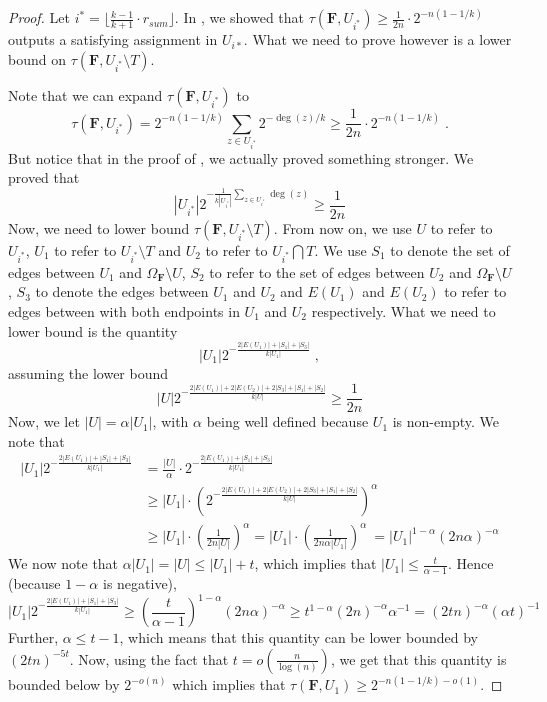 \documentclass[11pt, letterpaper]{article}
\theoremstyle{definition}
\newcommand{\f}{\mathbf{F}}
\newcommand{\Om}{\Omega_{\f}}
\begin{document}
\begin{proof}
        Let $i^*= \lfloor \frac{k-1}{k+1} \cdot r_{sum}\rfloor$. In , we showed that $\tau(\f,U_{i^*}) \geq \frac{1}{2n} \cdot 2^{-n(1-1/k)}$ outputs a satisfying assignment in $U_{i*}$. What we need to prove however is a lower bound on $\tau(\f, U_{i^*} \setminus T)$.

        \noindent
        Note that we can expand $\tau(\f, U_{i^*})$ to 
     \[ \tau(\f, U_{i^*}) = 2^{-n(1-1/k)} \sum_{z \in U_{i^*}} 2^{-\deg(z)/k} \geq \frac{1}{2n} \cdot 2^{-n(1-1/k)} \; . \]
     But notice that in the proof of , we actually proved something stronger. We proved that
     \[ |U_{i^*}| 2^{- \frac{1}{k|U_{i^*}|}\sum_{z \in U_{i^*}} \deg(z) } \geq \frac{1}{2n} \]
     Now, we need to lower bound $\tau(\f, U_{i^*} \setminus T)$. From now on, we use $U$ to refer to $U_{i^*}$, $U_1$ to refer to $U_{i^*} \setminus T$ and $U_2$ to refer to $U_{i^*} \bigcap T$. We use $S_1$ to denote the set of edges between $U_1$ and $\Om \setminus U$, $S_2$ to refer to the set of edges between $U_2$ and $\Om \setminus U$, $S_3$ to denote the edges between $U_1$ and $U_2$ and $E(U_1)$ and $E(U_2)$ to refer to edges between with both endpoints in $U_1$ and $U_2$ respectively. What we need to lower bound is the quantity 
     \[ |U_1| 2^{-  \frac{2|E(U_1)|+|S_1|+|S_3|}{k|U_1|}} \;,  \]
     assuming the lower bound
     \[  |U| 2^{-  \frac{2|E(U_1)|+2|E(U_2)|+2|S_3|+|S_1|+|S_2|}{k|U|}} \geq \frac{1}{2n}\]
     Now, we let $|U|= \alpha |U_1|$, with $\alpha$ being well defined because $U_1$ is non-empty. We note that
     \begin{align*}
         |U_1| 2^{-  \frac{2|E(U_1)|+|S_1|+|S_3|}{k|U_1|}} &= \frac{|U|}{\alpha} \cdot2^{-  \frac{2|E(U_1)|+|S_1|+|S_3|}{k|U_1|}} \\
         & \geq |U_1| \cdot \left(2^{- \frac{2|E(U_1)|+2|E(U_2)|+2|S_3|+|S_1|+|S_2|}{k |U|}}\right)^{\alpha}\\
         & \geq |U_1| \cdot \left(\frac{1}{2n|U|}\right)^\alpha = |U_1| \cdot \left(\frac{1}{2n\alpha |U_1|}\right)^\alpha\ = |U_1|^{1-\alpha} (2n \alpha)^{-\alpha} 
     \end{align*}
     We now note that $\alpha |U_1|=|U| \leq |U_1| + t$, which implies that $|U_1| \leq \frac{t}{\alpha -1}$. Hence (because $1-\alpha$ is negative),
    \begin{equation*}
         |U_1| 2^{-  \frac{2|E(U_1)|+|S_1|+|S_3|}{k|U_1|}}\geq \left(\frac{t}{\alpha -1}\right)^{1-\alpha} (2n \alpha )^{-\alpha} \geq t^{1-\alpha} (2n)^{-\alpha} \alpha^{-1}= (2tn)^{-\alpha} (\alpha t)^{-1}
     \end{equation*}
     Further, $\alpha \leq t-1$, which means that this quantity can be lower bounded by $(2tn)^{-5t}$. Now, using the fact that $t=o\left( \frac{n}{\log(n)}\right)$, we get that this quantity is bounded below by $2^{-o(n)}$ which implies that $\tau(\f, U_1) \geq 2^{-n(1-1/k) - o(1)}$. 
\end{proof}
\end{document}
